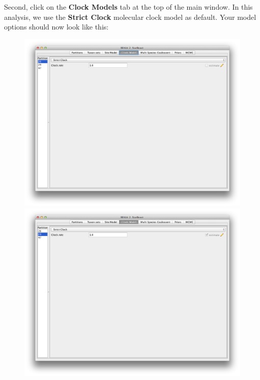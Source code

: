 \documentclass{article}
\begin{document}
Second, click on the {\bf Clock Models} tab at the top of the
main window. In this analysis, we use the \textbf{Strict Clock} molecular clock model as default.
Your model options should now look like this: 

\begin{figure}
\begin{center}

\includegraphics[scale=0.4,clip=true,trim=0 450 0 0]{figures/BEAUti_ClockModel1.png}

\includegraphics[scale=0.4,clip=true,trim=0 450 0 0]{figures/BEAUti_ClockModel2.png}


\end{center}
\end{figure}
\end{document}
